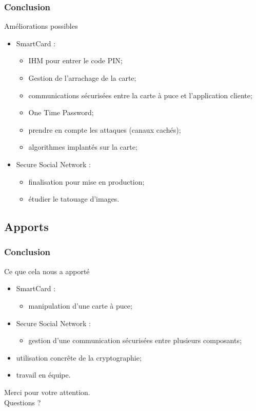 \documentclass{beamer}
\begin{document}
\begin{frame}
    \frametitle{Conclusion}
    \begin{block}{Améliorations possibles}
        \begin{itemize}
            \item SmartCard : 
                \begin{itemize}
                    \item IHM pour entrer le code PIN; %
                    \item Gestion de l'arrachage de la carte; %
                    \item communications sécurisées entre la carte à puce et l'application
                        cliente;
                    \item One Time Password;
                    \item prendre en compte les attaques (canaux cachés);
                    \item algorithmes implantés sur la carte;
                \end{itemize}
            \item Secure Social Network : 
                \begin{itemize}
                    \item finalisation pour mise en production;
                    \item étudier le tatouage d'images.
                \end{itemize}
        \end{itemize}
    \end{block}
\end{frame}

\subsection{Apports}
\begin{frame}
    \frametitle{Conclusion}
    \begin{block}{Ce que cela nous a apporté}
        \begin{itemize}
            \item SmartCard : 
                \begin{itemize}
                    \item manipulation d'une carte à puce;
                \end{itemize}
            \item Secure Social Network : 
                \begin{itemize}
                    \item gestion d'une communication sécurisées entre plusieurs
                        composants;
                \end{itemize}
            \item utilisation concrête de la cryptographie;
            \item travail en équipe.
        \end{itemize}
    \end{block}
\end{frame}

\begin{frame}
\begin{center}Merci pour votre attention.\\[2cm]
          Questions ?\end{center}
\end{frame}
\end{document}
